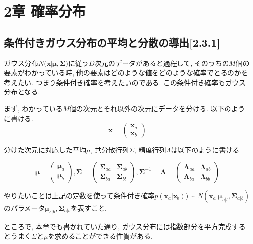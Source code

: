 \section{2章 確率分布}

\subsection{条件付きガウス分布の平均と分散の導出[2.3.1]}

ガウス分布$N(\bm{x}|\bm{\mu}, \bm{\Sigma)}$に従う$D$次元のデータがあると過程して, そのうちの$M$個の要素がわかっている時, 他の要素はどのような値をどのような確率でとるのかを考えたい. つまり条件付き確率を考えたいのである. この条件付き確率もガウス分布となる.

まず, わかっている$M$個の次元とそれ以外の次元にデータを分ける. 以下のように書ける.
\begin{equation}
    \bm{x} = 
    \begin{pmatrix}
        \bm{x}_a \\
        \bm{x}_b
    \end{pmatrix} \nonumber
\end{equation}

分けた次元に対応した平均$\mu$, 共分散行列$\Sigma$, 精度行列$\Lambda$は以下のように書ける.

\begin{equation}
    \bm{\mu} = 
    \begin{pmatrix}
        \bm{\mu}_a \\
        \bm{\mu}_b
    \end{pmatrix},
    \bm{\Sigma} = 
    \begin{pmatrix}
        \bm{\Sigma}_{aa} & \bm{\Sigma}_{ab} \\
        \bm{\Sigma}_{ba} & \bm{\Sigma}_{bb}
    \end{pmatrix},
    \bm{\Sigma}^{-1} = \bm{\Lambda} = 
    \begin{pmatrix}
        \bm{\Lambda}_{aa} & \bm{\Lambda}_{ab} \\
        \bm{\Lambda}_{ba} & \bm{\Lambda}_{bb}
    \end{pmatrix} \nonumber
\end{equation}

やりたいことは上記の定数を使って条件付き確率$p(\bm{x}_a | \bm{x}_b)) \sim N(\bm{x}_a| \bm{\mu}_{a|b}, \bm{\Sigma}_{a|b} )$のパラメータ$\bm{\mu}_{a|b}, \bm{\Sigma}_{a|b}$を表すこと.

ところで, 本章でも書かれていた通り, ガウス分布には指数部分を平方完成するとうまく$\Sigma$と$\mu$を求めることができる性質がある.

